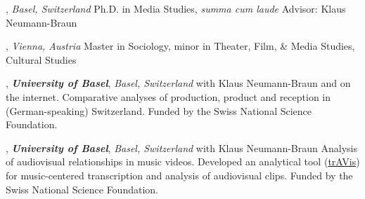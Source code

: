\documentclass[9pt]{article}
\begin{document}
\bigskip


, \emph{Basel, Switzerland} \vspace{0.01in} 
\newline Ph.D. in Media Studies, {\em summa cum laude}
\newline Advisor: Klaus Neumann-Braun
\bigskip

, \emph{Vienna, Austria} \vspace{0.01in}  
\newline\noindent Master in Sociology, minor in Theater, Film, \& Media Studies, Cultural Studies
\bigskip


\medskip
{}

, {\bf \em University of Basel}, \emph{Basel, Switzerland} \vspace{0.01in} 
\newline{}
\newline\noindent with Klaus Neumann-Braun \vspace{0.3em} 
\newline{} 
\newline\noindent and on the internet. Comparative analyses of production, 
\newline\noindent product and reception in (German-speaking) Switzerland. 
\newline\noindent Funded by the Swiss National Science Foundation.
\bigskip

, {\bf \em University of Basel}, \emph{Basel, Switzerland} \vspace{0.01in} 
\newline\noindent with Klaus Neumann-Braun \vspace{0.3em} 
\newline{} 
\newline\noindent Analysis of audiovisual relationships in music videos. 
\newline\noindent Developed an analytical tool (\href{http://travis-analysis.org/}{trAVis}) for music-centered 
\newline\noindent transcription and analysis of audiovisual clips.
\newline\noindent Funded by the Swiss National Science Foundation.
\bigskip
\end{document}
